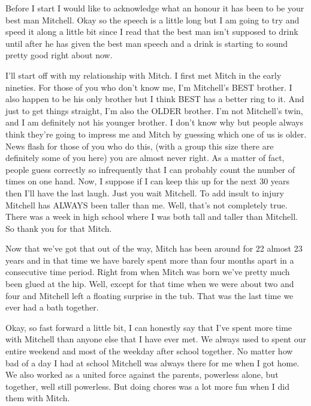 Before I start I would like to acknowledge what an honour it has been to be your best man Mitchell. Okay so the speech is a little long but I am going to try and speed it along a little bit since I read that the best man isn't supposed to drink until after he has given the best man speech and a drink is starting to sound pretty good right about now.

I'll start off with my relationship with Mitch. I first met Mitch in the early nineties. For those of you who don't know me, I'm Mitchell's BEST brother. I also happen to be his only brother but I think BEST has a better ring to it. And just to get things straight, I'm also the OLDER brother. I'm not Mitchell's twin, and I am definitely not his younger brother. I don't know why but people always think they're going to impress me and Mitch by guessing which one of us is older. News flash for those of you who do this, (with a group this size there are definitely some of you here) you are almost never right. As a matter of fact, people guess correctly so infrequently that I can probably count the number of times on one hand. Now, I suppose if I can keep this up for the next 30 years then I'll have the last laugh. Just you wait Mitchell. To add insult to injury Mitchell has ALWAYS been taller than me. Well, that's not completely true. There was a week in high school where I was both tall and taller than Mitchell. So thank you for that Mitch.

Now that we've got that out of the way, Mitch has been around for 22 almost 23 years and in that time we have barely spent more than four months apart in a consecutive time period. Right from when Mitch was born we've pretty much been glued at the hip. Well, except for that time when we were about two and four and Mitchell left a floating surprise in the tub. That was the last time we ever had a bath together.

Okay, so fast forward a little bit, I can honestly say that I've spent more time with Mitchell than anyone else that I have ever met. We always used to spent our entire weekend and most of the weekday after school together. No matter how bad of a day I had at school Mitchell was always there for me when I got home. We also worked as a united force against the parents, powerless alone, but together, well still powerless. But doing chores was a lot more fun when I did them with Mitch.

